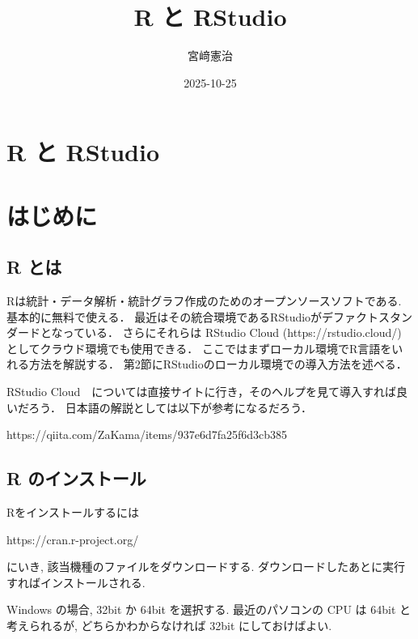 \documentclass[
  letterpaper,
  xelatex,
  ja=standard, xelatex]{bxjsbook}
\title{R と RStudio}
\author{宮﨑憲治}
\date{2025-10-25}
\renewcommand*\contentsname{目次}
\newcommand\contentsname{目次}
\begin{document}
\maketitle

\renewcommand*\contentsname{目次}
{
\hypersetup{linkcolor=}
\setcounter{tocdepth}{2}
\tableofcontents
}

\chapter{R と RStudio}\label{r-ux3068-rstudio}


\chapter*{はじめに}\label{ux306fux3058ux3081ux306b}


\section{R とは}\label{r-ux3068ux306f}

Rは統計・データ解析・統計グラフ作成のためのオープンソースソフトである.
基本的に無料で使える．
最近はその統合環境であるRStudioがデファクトスタンダードとなっている．
さらにそれらは RStudio Cloud (https://rstudio.cloud/)
としてクラウド環境でも使用できる．
ここではまずローカル環境でR言語をいれる方法を解説する．
第2節にRStudioのローカル環境での導入方法を述べる．

RStudio
Cloud　については直接サイトに行き，そのヘルプを見て導入すれば良いだろう．
日本語の解説としては以下が参考になるだろう．

https://qiita.com/ZaKama/items/937e6d7fa25f6d3cb385

\section{R
のインストール}\label{r-ux306eux30a4ux30f3ux30b9ux30c8ux30fcux30eb}

Rをインストールするには

https://cran.r-project.org/

にいき, 該当機種のファイルをダウンロードする.
ダウンロードしたあとに実行すればインストールされる.

Windows の場合, 32bit か 64bit を選択する. 最近のパソコンの CPU は 64bit
と考えられるが, どちらかわからなければ 32bit にしておけばよい.
\end{document}
